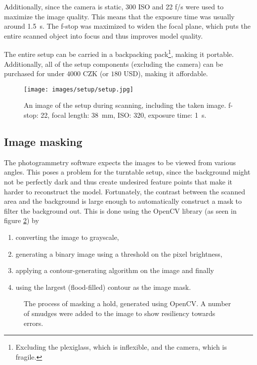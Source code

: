Additionally, since the camera is static, 300 ISO and 22 f/s were used to maximize the image quality.
This means that the exposure time was usually around \SI{1.5}{\second}.
The f-stop was maximized to widen the focal plane, which puts the entire scanned object into focus and thus improves model quality.

The entire setup can be carried in a backpacking pack\footnote{Excluding the plexiglass, which is inflexible, and the camera, which is fragile.}, making it portable.
Additionally, all of the setup components (excluding the camera) can be purchased for under $4000$ CZK (or $180$ USD), making it affordable.

\begin{figure}
	\centering
	\texttt{[image: images/setup/setup.jpg]}
	\caption{An image of the setup during scanning, including the taken image. f-stop: 22, focal length: \SI{38}{\milli\meter}, ISO: 320, exposure time: \SI{1}{\second}.}
	\label{fig:setup}
\end{figure}

\subsection{Image masking}
The photogrammetry software expects the images to be viewed from various angles.
This poses a problem for the turntable setup, since the background might not be perfectly dark and thus create undesired feature points that make it harder to reconstruct the model.
Fortunately, the contrast between the scanned area and the background is large enough to automatically construct a mask to filter the background out.
This is done using the OpenCV library (as seen in figure \ref{fig:mask}) by
\begin{enumerate}
	\item converting the image to grayscale,
	\item generating a binary image using a threshold on the pixel brightness,
	\item applying a contour-generating algorithm \cite{suzuki1985topological} on the image and finally
	\item using the largest (flood-filled) contour as the image mask.
\end{enumerate}

\begin{figure}
	\centering
	\hfill
	\hfill
	\hfill
	\hfill
	\caption{The process of masking a hold, generated using OpenCV. A number of smudges were added to the image to show resiliency towards errors.}%
	\label{fig:mask}
\end{figure}

